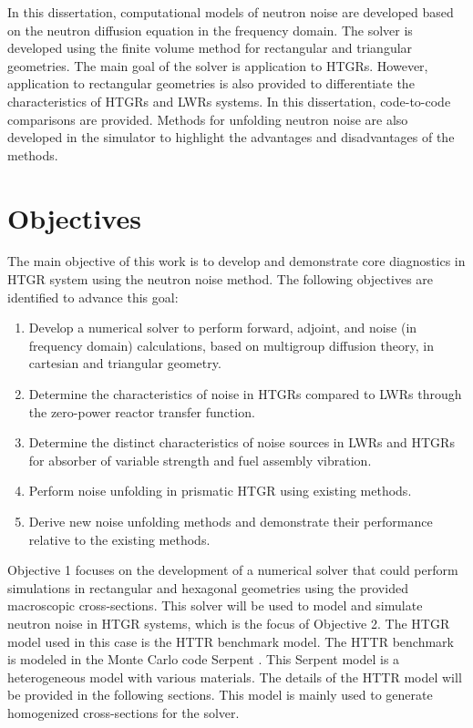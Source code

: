 In this dissertation, computational models of neutron noise are developed based on the neutron diffusion equation in the frequency domain. The solver is developed using the finite volume method for rectangular and triangular geometries. The main goal of the solver is application to \glspl*{HTGR}. However, application to rectangular geometries is also provided to differentiate the characteristics of \glspl*{HTGR} and \glspl*{LWR} systems. In this dissertation, code-to-code comparisons are provided. Methods for unfolding neutron noise are also developed in the simulator to highlight the advantages and disadvantages of the methods. 

\section{Objectives}

The main objective of this work is to develop and demonstrate core diagnostics in \gls*{HTGR} system using the neutron noise method. The following objectives are identified to advance this goal:
\begin{enumerate}
    \item Develop a numerical solver to perform forward, adjoint, and noise (in frequency domain) calculations, based on multigroup diffusion theory, in cartesian and triangular geometry.
    \item Determine the characteristics of noise in \glspl*{HTGR} compared to \glspl*{LWR} through the zero-power reactor transfer function.
    \item Determine the distinct characteristics of noise sources in \glspl*{LWR} and \glspl*{HTGR} for absorber of variable strength and fuel assembly vibration.
    \item Perform noise unfolding in prismatic \gls*{HTGR} using existing methods.
    \item Derive new noise unfolding methods and demonstrate their performance relative to the existing methods.
\end{enumerate}

Objective 1 focuses on the development of a numerical solver that could perform simulations in rectangular and hexagonal geometries using the provided macroscopic cross-sections. This solver will be used to model and simulate neutron noise in \gls*{HTGR} systems, which is the focus of Objective 2. The \gls*{HTGR} model used in this case is the \gls*{HTTR} benchmark model. The \gls*{HTTR} benchmark is modeled in the Monte Carlo code Serpent \cite{leppanenSerpentMonteCarlo2015}. This Serpent model is a heterogeneous model with various materials. The details of the \gls*{HTTR} model will be provided in the following sections. This model is mainly used to generate homogenized cross-sections for the solver. 

